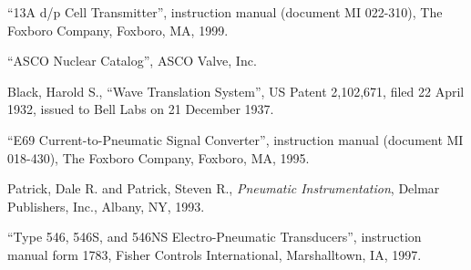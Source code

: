 
\noindent
``13A d/p Cell Transmitter'', instruction manual (document MI 022-310), The Foxboro Company, Foxboro, MA, 1999.

\vskip 10pt

\noindent
``ASCO Nuclear Catalog'', ASCO Valve, Inc.

\vskip 10pt

\noindent
Black, Harold S., ``Wave Translation System'', US Patent 2,102,671, filed 22 April 1932, issued to Bell Labs on 21 December 1937.

\vskip 10pt

\noindent
``E69 Current-to-Pneumatic Signal Converter'', instruction manual (document MI 018-430), The Foxboro Company, Foxboro, MA, 1995.

\vskip 10pt

\noindent
Patrick, Dale R. and Patrick, Steven R., \textit{Pneumatic Instrumentation}, Delmar Publishers, Inc., Albany, NY, 1993.

\vskip 10pt

\noindent
``Type 546, 546S, and 546NS Electro-Pneumatic Transducers'', instruction manual form 1783, Fisher Controls International, Marshalltown, IA, 1997.




















